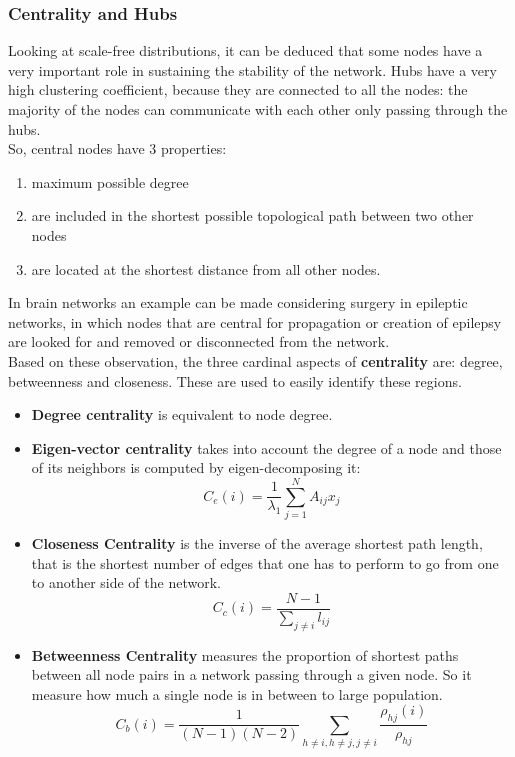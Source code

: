 \subsubsection{Centrality and Hubs}
Looking at scale-free distributions, it can be deduced that some nodes have a very important role in sustaining the stability of the network. Hubs have a very high clustering coefficient, because they are connected to all the nodes: the majority of the nodes can communicate with each other only passing through the hubs.\\
So, central nodes have 3 properties:
\begin{enumerate}
    \item maximum possible degree
    \item are included in the shortest possible topological path between two other nodes
    \item are located at the shortest distance from all other nodes.
\end{enumerate}
In brain networks an example can be made considering surgery in epileptic networks, in which nodes that are central for propagation or creation of epilepsy are looked for and removed or disconnected from the network.\\
Based on these observation, the three cardinal aspects of \textbf{centrality} are: degree, betweenness and closeness. 
These are used to easily identify these regions.
\begin{itemize}
    \item \textbf{Degree centrality} is equivalent to node degree.
    \item \textbf{Eigen-vector centrality} takes into account the degree of a node and those of its neighbors is computed by eigen-decomposing it:
    \begin{equation*}
        C_e(i)=\frac{1}{\lambda_1}\sum_{j=1}^NA_{ij}x_j
    \end{equation*}
    \item \textbf{Closeness Centrality} is the inverse of the average shortest path length, that is the shortest number of edges that one has to perform to go from one to another side of the network. 
    \begin{equation*}
        C_c(i)=\frac{N-1}{\sum_{j\neq i}l_{ij}}
    \end{equation*}
    \item \textbf{Betweenness Centrality} measures the proportion of shortest paths between all node pairs in a network passing through a given node. So it measure how much a single node is in between to large population. 
    \begin{equation*}
        C_b(i)=\frac{1}{(N-1)(N-2)}\sum_{h\neq i,h\neq j, j\neq i} \frac{\rho_{hj}(i)}{\rho_{hj}}
    \end{equation*}
\end{itemize}
